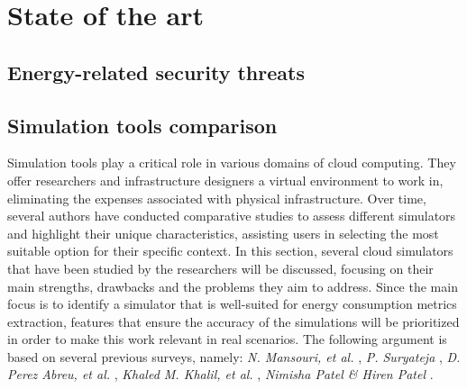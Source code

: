 
\chapter{State of the art}

\begin{citazione}
\end{citazione}
\newpage

\section{Energy-related security threats}

\section{Simulation tools comparison} { 
Simulation tools play a critical role in various domains of cloud computing. They offer researchers and infrastructure designers a virtual environment to work in, eliminating the expenses associated with physical infrastructure. Over time, several authors have conducted comparative studies to assess different simulators and highlight their unique characteristics, assisting users in selecting the most suitable option for their specific context. In this section, several cloud simulators that have been studied by the researchers will be discussed, focusing on their main strengths, drawbacks and the problems they aim to address. Since the main focus is to identify a simulator that is well-suited for energy consumption metrics extraction, features that ensure the accuracy of the simulations will be prioritized in order to make this work relevant in real scenarios. The following argument is based on several previous surveys, namely: \emph{N. Mansouri, et al.} \cite{mansouri2020cloud}, \emph{P. Suryateja} \cite{suryateja2016comparative}, \emph{D. Perez Abreu, et al.} \cite{abreu2020comparative}, \emph{Khaled M. Khalil, et al.} \cite{khalil2017cloud}, \emph{Nimisha Patel
\& Hiren Patel} \cite{patel2016comprehensive}.
 
}
